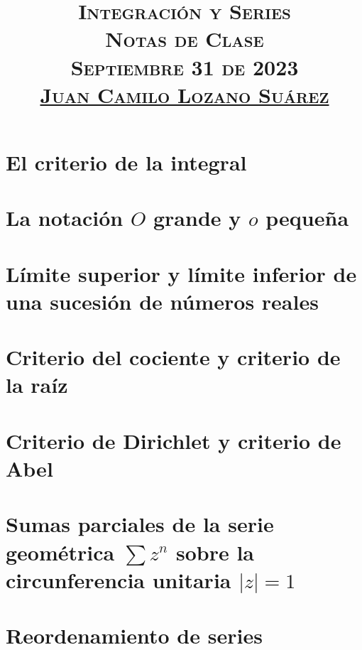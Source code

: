 \documentclass[letterpaper]{article} %
\title{
  \vspace{-1.5cm}
  \textsc{
    \Large{Integración y Series\\ Notas de Clase}\\ \vspace{0.2cm}
    \large{Septiembre 31 de 2023\\ \vspace{1cm} \underline{Juan Camilo Lozano Suárez}}\\
  }
}
\date{}
\begin{document}
  \maketitle
  \section{El criterio de la integral}
    
    
    
  \section{La notación $O$ grande y $o$ pequeña}
    
  \section{Límite superior y límite inferior de una sucesión de números reales}
    
  \section{Criterio del cociente y criterio de la raíz}
    
    
    
  \section{Criterio de Dirichlet y criterio de Abel}
    
    
    
  \section{Sumas parciales de la serie geométrica $\sum z^n$ sobre la circunferencia unitaria $|z|=1$}
    
  \section{Reordenamiento de series}
    
\end{document}
